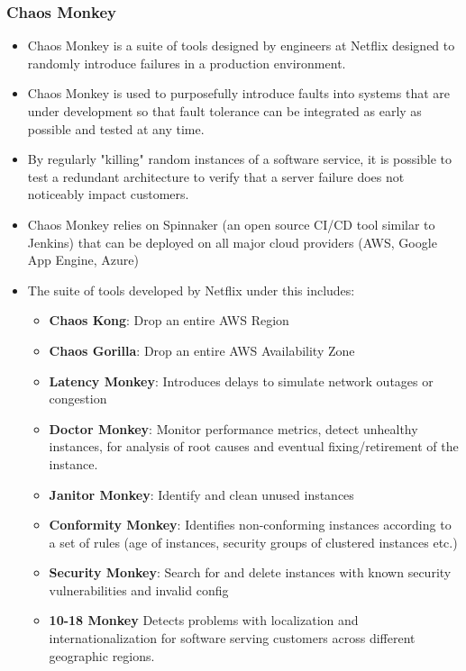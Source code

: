 \documentclass{article}
\begin{document}
\subsubsection{Chaos Monkey}
\begin{itemize}
    \item Chaos Monkey is a suite of tools designed by engineers at Netflix designed to randomly introduce failures in a production environment.  
    
    \item Chaos Monkey is used to purposefully introduce faults into systems that are under development so that fault tolerance can be integrated as early as possible and tested at any time. 
    
    \item By regularly "killing" random instances of a software service, it is possible to test a redundant architecture to verify that a server failure does not noticeably impact customers.
    
    \item Chaos Monkey relies on Spinnaker (an open source CI/CD tool similar to Jenkins) that can be deployed on all major cloud providers (AWS, Google App Engine, Azure)
    
    \item The suite of tools developed by Netflix under this includes:
    \begin{itemize}
        \item \textbf{Chaos Kong}: Drop an entire AWS Region
        
        \item \textbf{Chaos Gorilla}: Drop an entire AWS Availability Zone
        
        \item \textbf{Latency Monkey}: Introduces delays to simulate network outages or congestion
        
        \item \textbf{Doctor Monkey}: Monitor performance metrics, detect unhealthy instances, for analysis of root causes and eventual fixing/retirement of the instance.
        
        \item \textbf{Janitor Monkey}: Identify and clean unused instances 
        
        \item \textbf{Conformity Monkey}: Identifies non-conforming instances according to a set of rules (age of instances, security groups of clustered instances etc.)
        
        \item \textbf{Security Monkey}: Search for and delete instances with known security vulnerabilities and invalid config
        
        \item \textbf{10-18 Monkey} Detects problems with localization and internationalization for software serving customers across different geographic regions.
    \end{itemize}
\end{itemize}
\end{document}
